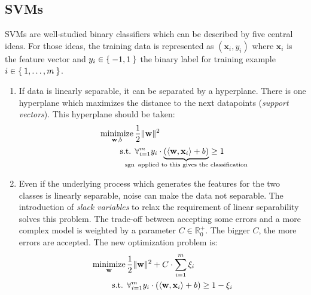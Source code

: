 
\subsection{SVMs}\label{subsec:trad-SVM}%

\Glspl{SVM} are well-studied binary classifiers which can be described by five
central ideas. For those ideas, the training data is represented as
$(\mathbf{x}_i, y_i)$ where $\mathbf{x}_i$ is the feature vector and $y_i \in
\Set{-1, 1}$ the binary label for training example $i \in \Set{1, \dots, m}$.


\begin{enumerate}
    \item If data is linearly separable, it can be separated by a hyperplane.
          There is one hyperplane which maximizes the distance to the next
          datapoints (\textit{support vectors}). This hyperplane should be
          taken:\\
          \begin{equation*}
          \begin{aligned}
              \minimize_{\mathbf{w}, b}\,&\frac{1}{2} \|\mathbf{w}\|^2\\
              \text{s.t. }& \forall_{i=1}^m y_i \cdot \underbrace{(\langle \mathbf{w}, \mathbf{x}_i\rangle + b)}_{\mathclap{\sgn \text{ applied to this gives the classification}}} \geq 1
          \end{aligned}
          \end{equation*}
    \item Even if the underlying process which generates the features for the
          two classes is linearly separable, noise can make the data not
          separable. The introduction of \textit{slack variables} to relax the
          requirement of linear separability solves this problem. The trade-off
          between accepting some errors and a more complex model is weighted by
          a parameter $C \in \mathbb{R}_0^+$. The bigger $C$, the more errors
          are accepted. The new optimization problem is:
          \begin{equation*}
          \begin{aligned}
              \operatorname*{minimize}_{\mathbf{w}}\,&\frac{1}{2} \|\mathbf{w}\|^2 + C \cdot \sum_{i=1}^m \xi_i\\
              \text{s.t. }& \forall_{i=1}^m y_i \cdot (\langle \mathbf{w}, \mathbf{x}_i\rangle + b) \geq 1 - \xi_i
          \end{aligned}
          \end{equation*}


\end{enumerate}
